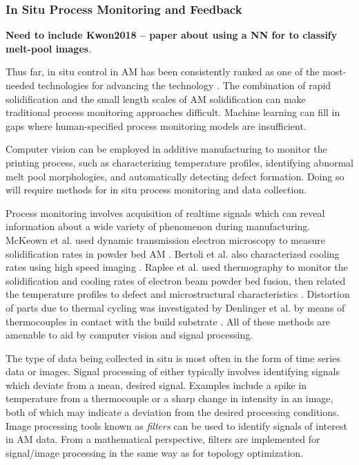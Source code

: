 \subsubsection{In Situ Process Monitoring and Feedback}

\textbf{Need to include Kwon2018 \cite{Kwon2018} -- paper about using a NN for to classify melt-pool images}.

Thus far, in situ control in AM has been consistently ranked as one of the most-needed technologies for advancing the technology \cite{Berumen2010, Tapia2014, Mani2017}. The combination of rapid solidification and the small length scales of AM solidification can make traditional process monitoring approaches difficult. Machine learning can fill in gaps where human-specified process monitoring models are insufficient.

Computer vision can be employed in additive manufacturing to monitor the printing process, such as characterizing temperature profiles, identifying abnormal melt pool morphologies, and automatically detecting defect formation. Doing so will require methods for in situ process monitoring and data collection. 

Process monitoring involves acquisition of realtime signals which can reveal information about a wide variety of phenomenon during manufacturing. McKeown et al. used dynamic transmission electron microscopy to measure solidification rates in powder bed AM \cite{McKeown2016}. Bertoli et al. also characterized cooling rates using high speed imaging \cite{Bertoli2017}. Raplee et al. used thermography to monitor the solidification and cooling rates of electron beam powder bed fusion, then related the temperature profiles to defect and microstructural characteristics \cite{Raplee2017}. Distortion of parts due to thermal cycling was investigated by Denlinger et al. by means of thermocouples in contact with the build substrate \cite{Denlinger2015}. All of these methods are amenable to aid by computer vision and signal processing.

The type of data being collected in situ is most often in the form of time series data or images. Signal processing of either typically involves identifying signals which deviate from a mean, desired signal. Examples include a spike in temperature from a thermocouple or a sharp change in intensity in an image, both of which may indicate a deviation from the desired processing conditions. Image processing tools known as \textit{filters} can be used to identify signals of interest in AM data. From a mathematical perspective, filters are implemented for signal/image processing in the same way as for topology optimization. 

